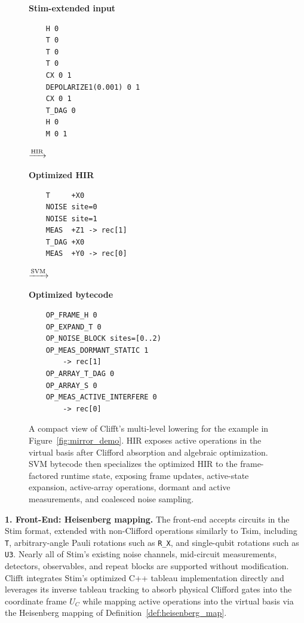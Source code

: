 \documentclass[a4paper, onecolumn, unpublished]{quantumarticle}
\begin{document}
    \begin{figure}[t]
    \centering
    \small
    \begin{minipage}[t]{0.29\textwidth}
    \centering\textbf{Stim-extended input}
    \begin{verbatim}
    H 0
    T 0
    T 0
    T 0
    CX 0 1
    DEPOLARIZE1(0.001) 0 1
    CX 0 1
    T_DAG 0
    H 0
    M 0 1
    \end{verbatim}
    \end{minipage}\hfill
    $\xrightarrow{\text{\scriptsize HIR}}$\hfill
    \begin{minipage}[t]{0.25\textwidth}
    \centering\textbf{Optimized HIR}
    \begin{verbatim}
    T     +X0
    NOISE site=0
    NOISE site=1
    MEAS  +Z1 -> rec[1]
    T_DAG +X0
    MEAS  +Y0 -> rec[0]
    \end{verbatim}
    \end{minipage}\hfill
    $\xrightarrow{\text{\scriptsize SVM}}$\hfill
    \begin{minipage}[t]{0.31\textwidth}
    \centering\textbf{Optimized bytecode}
    \begin{verbatim}
    OP_FRAME_H 0
    OP_EXPAND_T 0
    OP_NOISE_BLOCK sites=[0..2)
    OP_MEAS_DORMANT_STATIC 1
        -> rec[1]
    OP_ARRAY_T_DAG 0
    OP_ARRAY_S 0
    OP_MEAS_ACTIVE_INTERFERE 0
        -> rec[0]
    \end{verbatim}
    \end{minipage}
    \caption{A compact view of Clifft's multi-level lowering for the example in Figure~\ref{fig:mirror_demo}. HIR exposes active operations in the virtual basis after Clifford absorption and algebraic optimization. SVM bytecode then specializes the optimized HIR to the frame-factored runtime state, exposing frame updates, active-state expansion, active-array operations, dormant and active measurements, and coalesced noise sampling.}
    \label{fig:pipeline_demo}
    \end{figure}

    \textbf{1. Front-End: Heisenberg mapping.}
    The front-end accepts circuits in the Stim format, extended with non-Clifford operations similarly to Tsim, including \texttt{T}, arbitrary-angle Pauli rotations such as \texttt{R\_X}, and single-qubit rotations such as \texttt{U3}\cite{haenelTsimFastUniversal2026}. Nearly all of Stim's existing noise channels, mid-circuit measurements, detectors, observables, and repeat blocks are supported without modification. Clifft integrates Stim's optimized C++ tableau implementation directly and leverages its inverse tableau tracking to absorb physical Clifford gates into the coordinate frame $U_C$ while mapping active operations into the virtual basis via the Heisenberg mapping of Definition~\ref{def:heisenberg_map}.
\end{document}
